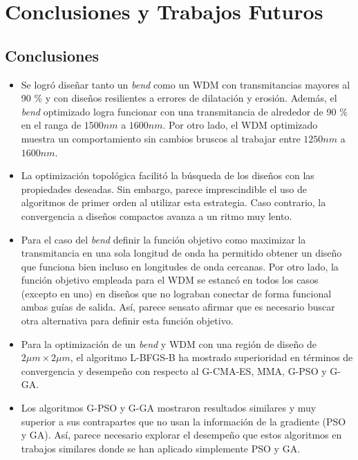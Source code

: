 \chapter{Conclusiones y Trabajos Futuros}\label{chapter:conclutions}

\section{Conclusiones}

\begin{itemize}

  \item Se logró diseñar tanto un \emph{bend} como un WDM con transmitancias mayores al 90 \% y
        con diseños resilientes a errores de dilatación y erosión.
        Además, el \emph{bend} optimizado logra funcionar con una transmitancia de alrededor de 90 \%
        en el ranga de $1500nm$ a $1600 nm$. Por otro lado, el WDM optimizado muestra un comportamiento
        sin cambios bruscos al trabajar entre $1250 nm$ a $1600 nm$.

  \item La optimización topológica facilitó la búsqueda de los diseños con las propiedades deseadas.
        Sin embargo, parece imprescindible el uso de algoritmos de primer orden al utilizar
        esta estrategia. Caso contrario, la convergencia a diseños compactos avanza a un ritmo muy lento.

  \item Para el caso del \emph{bend} definir la función objetivo como maximizar la transmitancia en una
        sola longitud de onda ha permitido obtener un diseño que funciona bien incluso en longitudes de
        onda cercanas. Por otro lado, la función objetivo empleada para el WDM se estancó en todos los
        casos (excepto en uno) en diseños que no lograban conectar de forma funcional ambas guías de salida.
        Así, parece sensato afirmar que es necesario buscar otra alternativa para definir esta función
objetivo.

  \item Para la optimización de un \emph{bend} y WDM con una región de diseño de $2 \mu m \times 2 \mu m$,
        el algoritmo L-BFGS-B ha mostrado superioridad en términos de convergencia y desempeño con respecto
        al G-CMA-ES, MMA, G-PSO y G-GA. 

  \item Los algoritmos G-PSO y G-GA mostraron resultados similares y muy superior a sus contrapartes que no
        usan la información de la gradiente (PSO y GA).
        Así, parece necesario explorar el desempeño que estos algoritmos en trabajos similares
        donde se han aplicado simplemente PSO y GA.


\end{itemize}

